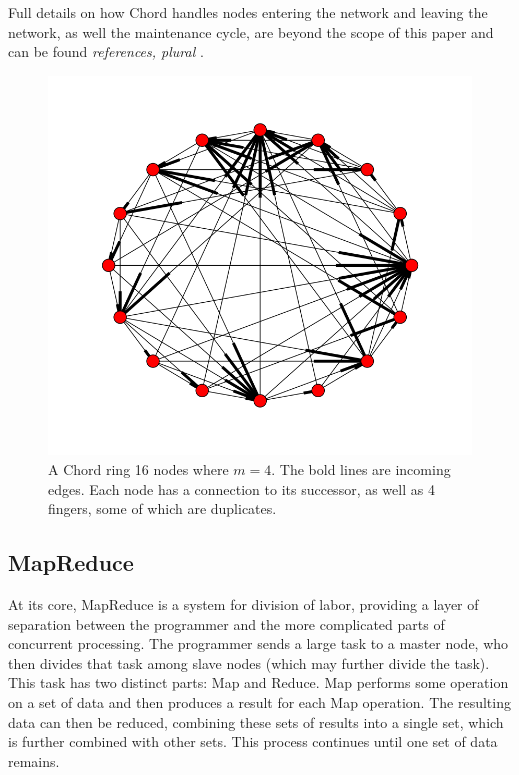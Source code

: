 \documentclass[10pt, conference, compsocconf]{IEEEtran}
\begin{document}
Full details on how Chord handles nodes entering the network and leaving the network, as well the maintenance cycle, are beyond the scope of this paper and can be found \textit{references, plural} \cite{Chord}.

\begin{figure}
    \includegraphics[width=\linewidth]{chordreal}
    \caption{A Chord ring 16 nodes where $m=4$.  The bold lines are incoming edges.  Each node has a connection to its successor, as well as 4 fingers, some of which are duplicates.}
    \label{chordreal}
\end{figure}





\subsection{MapReduce}
At its core, MapReduce \cite{mapreduce} is a system for division of labor, providing a layer of separation between the programmer and the more complicated parts of concurrent processing.  The programmer sends a large task to a master node, who then divides that task among slave nodes (which may further divide the task).  This task has two distinct parts: Map and Reduce.  Map performs some operation on a set of data and then produces a result for each Map operation.  The resulting data can then be reduced, combining these sets of results into a single set, which is further combined with other sets.  This process continues until one set of data remains.
\end{document}
